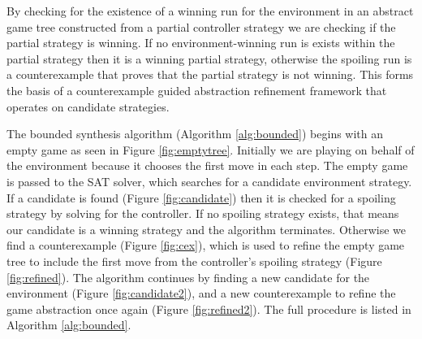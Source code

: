 \documentclass{llncs}
\begin{document}
By checking for the existence of a winning run for the environment in an
abstract game tree constructed from a partial controller strategy we are
checking if the partial strategy is winning. If no environment-winning run is
exists within the partial strategy then it is a winning partial strategy,
otherwise the spoiling run is a counterexample that proves that the partial
strategy is not winning. This forms the basis of a counterexample guided
abstraction refinement framework \cite{clarke2000} that operates on candidate strategies.

The bounded synthesis algorithm (Algorithm \ref{alg:bounded}) begins with an
empty game as seen in Figure \ref{fig:emptytree}.  Initially we are playing on
behalf of the environment because it chooses the first move in each step.  The
empty game is passed to the SAT solver, which searches for a candidate
environment strategy.  If a candidate is found (Figure \ref{fig:candidate})
then it is checked for a spoiling strategy by solving for the controller.  If
no spoiling strategy exists, that means our candidate is a winning strategy and
the algorithm terminates.  Otherwise we find a counterexample (Figure
\ref{fig:cex}), which is used to refine the empty game tree to include the
first move from the controller's spoiling strategy (Figure \ref{fig:refined}).
The algorithm continues by finding a new candidate for the environment (Figure
\ref{fig:candidate2}), and a new counterexample to refine the game abstraction
once again (Figure \ref{fig:refined2}). The full procedure is listed in
Algorithm \ref{alg:bounded}.
\end{document}
